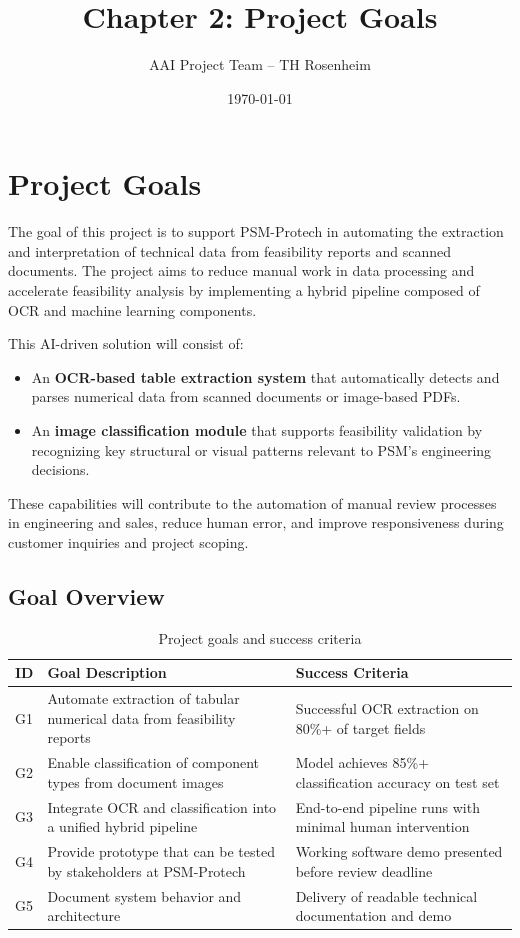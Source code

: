 \documentclass[12pt]{article}
\title{Chapter 2: Project Goals}
\author{AAI Project Team -- TH Rosenheim}
\date{\today}
\begin{document}
\maketitle

\section{Project Goals}

The goal of this project is to support PSM-Protech in automating the extraction and interpretation of technical data from feasibility reports and scanned documents. The project aims to reduce manual work in data processing and accelerate feasibility analysis by implementing a hybrid pipeline composed of OCR and machine learning components.

This AI-driven solution will consist of:
\begin{itemize}
    \item An \textbf{OCR-based table extraction system} that automatically detects and parses numerical data from scanned documents or image-based PDFs.
    \item An \textbf{image classification module} that supports feasibility validation by recognizing key structural or visual patterns relevant to PSM’s engineering decisions.
\end{itemize}

These capabilities will contribute to the automation of manual review processes in engineering and sales, reduce human error, and improve responsiveness during customer inquiries and project scoping.

\subsection*{Goal Overview}

\begin{table}[ht]
\centering
\begin{tabular}{|p{1cm}|p{8cm}|p{4cm}|}
\hline
\textbf{ID} & \textbf{Goal Description} & \textbf{Success Criteria} \\
\hline
G1 & Automate extraction of tabular numerical data from feasibility reports & Successful OCR extraction on 80\%+ of target fields \\
\hline
G2 & Enable classification of component types from document images & Model achieves 85\%+ classification accuracy on test set \\
\hline
G3 & Integrate OCR and classification into a unified hybrid pipeline & End-to-end pipeline runs with minimal human intervention \\
\hline
G4 & Provide prototype that can be tested by stakeholders at PSM-Protech & Working software demo presented before review deadline \\
\hline
G5 & Document system behavior and architecture & Delivery of readable technical documentation and demo \\
\hline
\end{tabular}
\caption{Project goals and success criteria}
\label{tab:project_goals}
\end{table}
\end{document}
